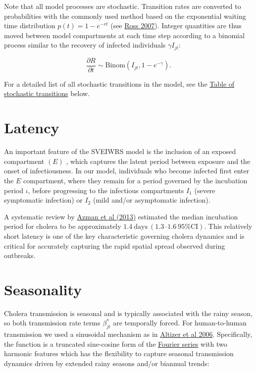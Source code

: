 \documentclass[
]{book}
\begin{document}
Note that all model processes are stochastic. Transition rates are converted to probabilities with the commonly used method based on the exponential waiting time distribution \(p(t) = 1-e^{-rt}\) (see \href{https://www.google.com/books/edition/Introduction_to_Probability_Models/1uxBwhAb_zYC?hl=en}{Ross 2007}). Integer quantities are thus moved between model compartments at each time step according to a binomial process similar to the recovery of infected individuals \(\gamma I_{jt}\):

\begin{equation}
\frac{\partial R}{\partial t} \sim \text{Binom}(I_{jt}, 1-e^{-\gamma}).
\end{equation}

For a detailed list of all stochastic transitions in the model, see the \hyperref[transitions-table]{Table of stochastic transitions} below.

\section{Latency}\label{latency}

An important feature of the SVEIWRS model is the inclusion of an exposed compartment \(\left(E\right)\) , which captures the latent period between exposure and the onset of infectiousness. In our model, individuals who become infected first enter the \(E\) compartment, where they remain for a period governed by the incubation period \(\iota\), before progressing to the infectious compartments \(I_1\) (severe symptomatic infection) or \(I_2\) (mild and/or asymptomatic infection).

A systematic review by \href{http://www.sciencedirect.com/science/article/pii/S0163445312003477}{Azman et al (2013)} estimated the median incubation period for cholera to be approximately \(1.4 \ \text{days} \ (1.3–1.6 \ 95\% \text{CI})\). This relatively short latency is one of the key characteristic governing cholera dynamics and is critical for accurately capturing the rapid spatial spread observed during outbreaks.

\section{Seasonality}\label{seasonality}

Cholera transmission is seasonal and is typically associated with the rainy season, so both transmission rate terms \(\beta_{jt}^{\text{*}}\) are temporally forced. For human-to-human transmission we used a sinusoidal mechanism as in \href{https://onlinelibrary.wiley.com/doi/epdf/10.1111/j.1461-0248.2005.00879.x}{Altizer et al 2006}. Specifically, the function is a truncated sine-cosine form of the \href{https://en.wikipedia.org/wiki/Fourier_series}{Fourier series} with two harmonic features which has the flexibility to capture seasonal transmission dynamics driven by extended rainy seasons and/or biannual trends:
\end{document}
